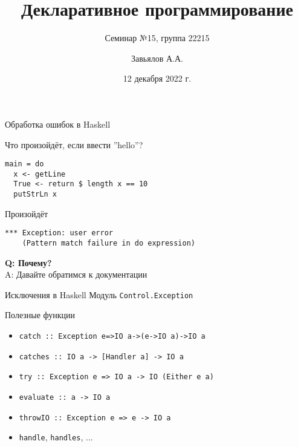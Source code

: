 \documentclass{beamer}
\title{Декларативное программирование}
\subtitle{Семинар №15, группа 22215}
\author{Завьялов А.А.}
\date{12 декабря 2022 г.}
\institute{Кафедра систем информатики ФИТ НГУ}
\newcommand{\hs}[1]{\texttt{#1}}
\begin{document}
  \maketitle
\begin{frame}[fragile]{Обработка ошибок в Haskell}
\begin{block}{Что произойдёт, если ввести ''hello''?}
\begin{verbatim}
main = do
  x <- getLine
  True <- return $ length x == 10
  putStrLn x
\end{verbatim}
\end{block}
\pause
\begin{block}{Произойдёт}    
\begin{verbatim}
*** Exception: user error
    (Pattern match failure in do expression)
\end{verbatim}
\end{block}
\pause
\begin{center}
\textbf{Q: Почему?} \pause
\\
A: Давайте обратимся к документации
\end{center}
\end{frame}
\begin{frame}{Исключения в Haskell}
    Модуль \hs{Control.Exception}
    \begin{block}{Полезные функции}
        \begin{itemize}
            \item \hs{catch :: Exception e=>IO a->(e->IO a)->IO a}
            \item \hs{catches :: IO a -> [Handler a] -> IO a}
            \item \hs{try :: Exception e => IO a -> IO (Either e a)}
            \item \hs{evaluate :: a -> IO a}
            \item \hs{throwIO :: Exception e => e -> IO a}
            \item \hs{handle}, \hs{handles}, ...
        \end{itemize}
    \end{block}
\end{frame}
\end{document}
